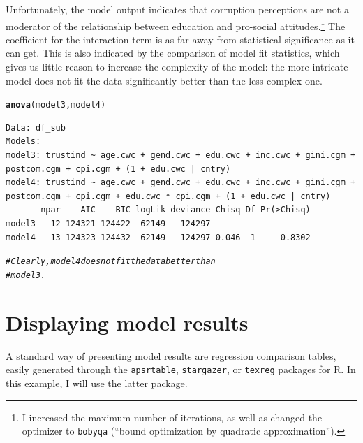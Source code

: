 \documentclass[12pt,english]{article}\usepackage[]{graphicx}\usepackage[usenames, dvipsnames]{xcolor}
\makeatletter
\newcommand{\hlcom}[1]{\textcolor[rgb]{0.678,0.584,0.686}{\textit{#1}}}%
\newcommand{\hlstd}[1]{\textcolor[rgb]{0.345,0.345,0.345}{#1}}%
\newcommand{\hlkwd}[1]{\textcolor[rgb]{0.737,0.353,0.396}{\textbf{#1}}}%
\newenvironment{kframe}{%
 \def\at@end@of@kframe{}%
 \ifinner\ifhmode%
  \def\at@end@of@kframe{\end{minipage}}%
  \begin{minipage}{\columnwidth}%
 \fi\fi%
 \def\FrameCommand##1{\hskip\@totalleftmargin \hskip-\fboxsep
 \colorbox{shadecolor}{##1}\hskip-\fboxsep
     \hskip-\linewidth \hskip-\@totalleftmargin \hskip\columnwidth}%
 \MakeFramed {\advance\hsize-\width
   \@totalleftmargin\z@ \linewidth\hsize
   \@setminipage}}%
 {\par\unskip\endMakeFramed%
 \at@end@of@kframe}
\newenvironment{knitrout}{}{} %
\makeatother
\begin{document}
Unfortunately, the model output indicates that corruption perceptions are not a moderator of the relationship between education and pro-social attitudes.\footnote{I increased the maximum number of iterations, as well as changed the optimizer to \texttt{bobyqa} (``bound optimization by quadratic approximation'').} The coefficient for the interaction term is as far away from statistical significance as it can get. This is also indicated by the comparison of model fit statistics, which gives us little reason to increase the complexity of the model: the more intricate model does not fit the data significantly better than the less complex one.

\begin{knitrout}
\color{fgcolor}\begin{kframe}
\begin{alltt}
\hlkwd{anova}\hlstd{(model3, model4)}
\end{alltt}
\begin{verbatim}
Data: df_sub
Models:
model3: trustind ~ age.cwc + gend.cwc + edu.cwc + inc.cwc + gini.cgm + postcom.cgm + cpi.cgm + (1 + edu.cwc | cntry)
model4: trustind ~ age.cwc + gend.cwc + edu.cwc + inc.cwc + gini.cgm + postcom.cgm + cpi.cgm + edu.cwc * cpi.cgm + (1 + edu.cwc | cntry)
       npar    AIC    BIC logLik deviance Chisq Df Pr(>Chisq)
model3   12 124321 124422 -62149   124297                    
model4   13 124323 124432 -62149   124297 0.046  1     0.8302
\end{verbatim}
\begin{alltt}
\hlcom{# Clearly, model 4 does not fit the data better than}
\hlcom{#   model 3.}
\end{alltt}
\end{kframe}
\end{knitrout}


\section{Displaying model results}

A standard way of presenting model results are regression comparison tables, easily generated through the \texttt{apsrtable}, \texttt{stargazer}, or \texttt{texreg} packages for R. In this example, I will use the latter package.
\end{document}
